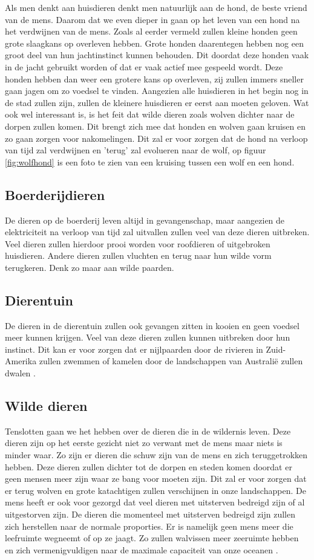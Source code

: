 Als men denkt aan huisdieren denkt men natuurlijk aan de hond, de beste vriend van de mens. Daarom dat we even dieper in gaan op het leven van een hond na het verdwijnen van de mens. Zoals al eerder vermeld zullen kleine honden geen grote slaagkans op overleven hebben. Grote honden daarentegen hebben nog een groot deel van hun jachtinstinct kunnen behouden. Dit doordat deze honden vaak in de jacht gebruikt worden of dat er vaak actief mee gespeeld wordt. Deze honden hebben dan weer een grotere kans op overleven, zij zullen immers sneller gaan jagen om zo voedsel te vinden. Aangezien alle huisdieren in het begin nog in de stad zullen zijn, zullen de kleinere huisdieren er eerst aan moeten geloven. Wat ook wel interessant is, is het feit dat wilde dieren zoals wolven dichter naar de dorpen zullen komen. Dit brengt zich mee dat honden en wolven gaan kruisen en zo gaan zorgen voor nakomelingen. Dit zal er voor zorgen dat de hond na verloop van tijd zal verdwijnen en 'terug' zal evolueren naar de wolf, op figuur \ref{fig:wolfhond} is een foto te zien van een kruising tussen een wolf en een hond.
\subsection{Boerderijdieren}
De dieren op de boerderij leven altijd in gevangenschap, maar aangezien de elektriciteit na verloop van tijd zal uitvallen zullen veel van deze dieren uitbreken. Veel dieren zullen hierdoor prooi worden voor roofdieren of uitgebroken huisdieren. Andere dieren zullen vluchten en terug naar hun wilde vorm terugkeren. Denk zo maar aan wilde paarden.
\subsection{Dierentuin}
De dieren in de dierentuin zullen ook gevangen zitten in kooien en geen voedsel meer kunnen krijgen. Veel van deze dieren zullen kunnen uitbreken door hun instinct. Dit kan er voor zorgen dat er nijlpaarden door de rivieren in Zuid-Amerika zullen zwemmen of kamelen door de landschappen van Australi\"{e} zullen dwalen \cite{ASAPScience}.
\subsection{Wilde dieren}
Tenslotten gaan we het hebben over de dieren die in de wildernis leven. Deze dieren zijn op het eerste gezicht niet zo verwant met de mens maar niets is minder waar.
\newline
Zo zijn er dieren die schuw zijn van de mens en zich teruggetrokken hebben. Deze dieren zullen dichter tot de dorpen en steden komen doordat er geen mensen meer zijn waar ze bang voor moeten zijn. Dit zal er voor zorgen dat er terug wolven en grote katachtigen zullen verschijnen in onze landschappen.
\newline
De mens heeft er ook voor gezorgd dat veel dieren met uitsterven bedreigd zijn of al uitgestorven zijn. De dieren die momenteel met uitsterven bedreigd zijn zullen zich herstellen naar de normale proporties. Er is namelijk geen mens meer die leefruimte wegneemt of op ze jaagt. Zo zullen walvissen meer zeeruimte hebben en zich vermenigvuldigen naar de maximale capaciteit van onze oceanen \cite{LAPOutbreak}.


